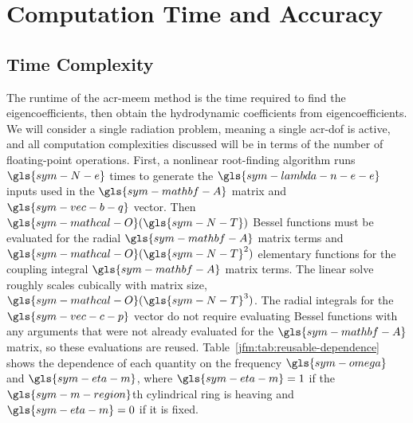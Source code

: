 \documentclass[ASNA,twocolumn]{USG} %
\begin{document}
\section{Computation Time and Accuracy}\label{jfm:sec:compute-time}
\subsection{Time Complexity}
The runtime of the \gls{acr-meem} method is the time required to find the eigencoefficients, then obtain the hydrodynamic coefficients from eigencoefficients.
We will consider a single radiation problem, meaning a single \gls{acr-dof} is active, and all computation complexities discussed will be in terms of the number of floating-point operations.
First, a nonlinear root-finding algorithm runs $\gls{sym-N-e}$ times to generate the $\gls{sym-lambda-n-e-e}$ inputs used in the $\gls{sym-mathbf-A}$ matrix and $\gls{sym-vec-b-q}$ vector.
Then $\gls{sym-mathcal-O}(\gls{sym-N-T})$ Bessel functions must be evaluated for the radial $\gls{sym-mathbf-A}$ matrix terms %
and $\gls{sym-mathcal-O}(\gls{sym-N-T}^2)$ elementary functions for the coupling integral $\gls{sym-mathbf-A}$ matrix terms.
The linear solve roughly scales cubically with matrix size, $\gls{sym-mathcal-O}(\gls{sym-N-T}^3)$.
The radial integrals for the $\gls{sym-vec-c-p}$ vector do not require evaluating Bessel functions with any arguments that were not already evaluated for the $\gls{sym-mathbf-A}$ matrix, so these evaluations are reused.
Table~\ref{jfm:tab:reusable-dependence} shows the dependence of each quantity on the frequency $\gls{sym-omega}$ and $\gls{sym-eta-m}$, where $\gls{sym-eta-m}=1$ if the $\gls{sym-m-region}$th cylindrical ring is heaving and $\gls{sym-eta-m}=0$ if it is fixed. 
\end{document}
